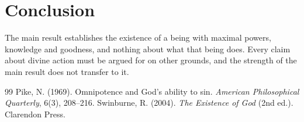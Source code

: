 \documentclass{situationist-preprint}
\begin{document}
\section{Conclusion}

The main result establishes the existence of a being with maximal powers, knowledge and goodness, and nothing about what that being does. Every claim about divine action must be argued for on other grounds, and the strength of the main result does not transfer to it.

\begin{thebibliography}{99}\small
{} Pike, N. (1969). Omnipotence and God's ability to sin. \emph{American Philosophical Quarterly}, 6(3), 208--216.
 Swinburne, R. (2004). \emph{The Existence of God} (2nd ed.). Clarendon Press.
\end{thebibliography}
\end{document}
